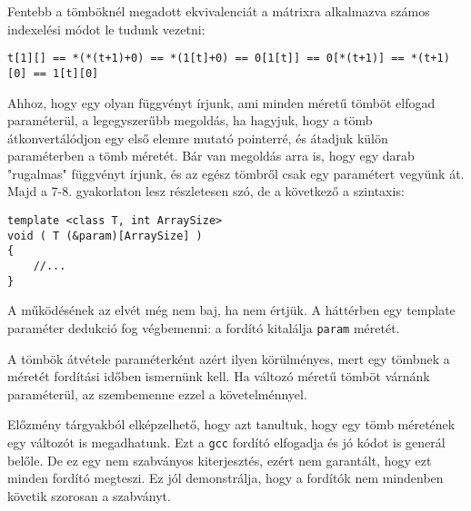 \documentclass[a4paper,11.5pt,table]{article}
\begin{document}
		\medskip
		Fentebb a tömböknél megadott ekvivalenciát a mátrixra alkalmazva számos indexelési módot le tudunk vezetni:
		\medskip
		
		\begin{center}
			\texttt{t[1][] == *(*(t+1)+0) == *(1[t]+0) == 0[1[t]] == 0[*(t+1)] == *(t+1)[0] == 1[t][0] } 
		\end{center}
	\begin{note}
		Ahhoz, hogy egy olyan függvényt írjunk, ami minden méretű tömböt elfogad paraméterül, a legegyszerűbb megoldás, ha hagyjuk, hogy a tömb átkonvertálódjon egy első elemre mutató pointerré, és átadjuk külön paraméterben a tömb méretét. Bár van megoldás arra is, hogy egy darab "rugalmas" függvényt írjunk, és az egész tömbről csak egy paramétert vegyünk át. Majd a 7-8. gyakorlaton lesz részletesen szó, de a következő a szintaxis:
		\begin{lstlisting}
template <class T, int ArraySize>
void ( T (&param)[ArraySize] )
{
	//...
}
		\end{lstlisting}
		\smallskip
		A működésének az elvét még nem baj, ha nem értjük. A háttérben egy template paraméter dedukció fog végbemenni: a fordító kitalálja \texttt{param} méretét. 
		
		\smallskip
		A tömbök átvétele paraméterként azért ilyen körülményes, mert egy tömbnek a méretét fordítási időben ismernünk kell. Ha változó méretű tömböt várnánk paraméterül, az szembemenne ezzel a követelménnyel.  
	\end{note}
	\begin{note}
		Előzmény tárgyakból elképzelhető, hogy azt tanultuk, hogy egy tömb méretének egy változót is megadhatunk. Ezt a \texttt{gcc} fordító elfogadja és jó kódot is generál belőle. De ez egy nem szabványos kiterjesztés, ezért nem garantált, hogy ezt minden fordító megteszi. Ez jól demonstrálja, hogy a fordítók nem mindenben követik szorosan a szabványt.
	\end{note}
\end{document}
